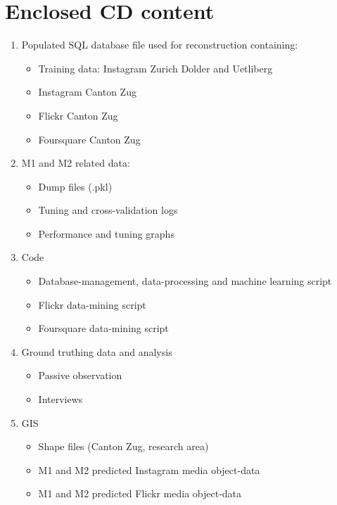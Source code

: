 \chapter*{Enclosed CD content} \label{CD_content}
\begin{enumerate}
    \item Populated SQL database file used for reconstruction containing:
    \begin{itemize}
        \item Training data: Instagram Zurich Dolder and Uetliberg
        \item Instagram Canton Zug
        \item Flickr Canton Zug
        \item Foursquare Canton Zug
    \end{itemize}
    \item M1 and M2 related data:
    \begin{itemize}
        \item Dump files (.pkl)
        \item Tuning and cross-validation logs
        \item Performance and tuning graphs
    \end{itemize}
    \item Code
    \begin{itemize}
        \item Database-management, data-processing and machine learning script
        \item Flickr data-mining script
        \item Foursquare data-mining script
    \end{itemize}
    \item Ground truthing data and analysis
    \begin{itemize}
        \item Passive observation
        \item Interviews
    \end{itemize}
    \item GIS
    \begin{itemize}
        \item Shape files (Canton Zug, research area)
        \item M1 and M2 predicted Instagram media object-data
        \item M1 and M2 predicted Flickr media object-data
    \end{itemize}
\end{enumerate}